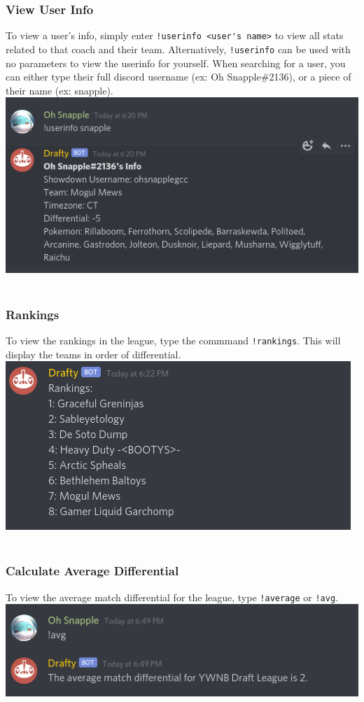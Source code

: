 \documentclass{article}
\begin{document}
\subsubsection*{View User Info}
To view a user's info, simply enter \verb|!userinfo <user's name>| to view all stats related to that coach and their team.
Alternatively, \verb|!userinfo| can be used with no parameters to view the userinfo for yourself.
When searching for a user, you can either type their full discord username (ex: Oh Snapple\#2136), or a piece of their name (ex: snapple).\\
\includegraphics[scale=.5]{userinfo.png}
\\\\
\subsubsection*{Rankings}
To view the rankings in the league, type the commmand \verb|!rankings|. This will display the teams in order of differential.\\
\includegraphics[scale=.5]{rankings.png}
\\\\
\subsubsection*{Calculate Average Differential}
To view the average match differential for the league, type \verb|!average| or \verb|!avg|.\\
\includegraphics[scale=.5]{avg.png}
\\\\
\end{document}
